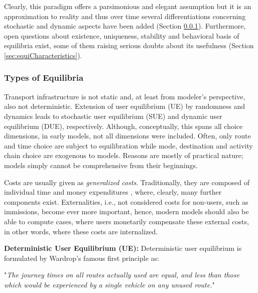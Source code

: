 Clearly, this paradigm offers a parsimonious and elegant assumption but it is an approximation to reality and thus over time several differentiations concerning stochastic and dynamic aspects have been added (Section \ref{sec:types}). Furthermore, open questions about existence, uniqueness, stability and behavioral basis of equilibria exist, some of them raising serious doubts about its usefulness (Section \ref{sec:equiCharacteristics}).

\subsubsection{Types of Equilibria}
\label{sec:types}
Transport infrastructure is not static and, at least from modeler's perspective, also not deterministic. Extension of user equilibrium (UE) by randomness and dynamics leads to stochastic user equilibrium (SUE) and dynamic user equilibrium (DUE), respectively. Although, conceptually, this spans all choice dimensions, in early models, not all dimensions were included. Often, only route and time choice are subject to equilibration while mode, destination and activity chain choice are exogenous to models. Reasons are mostly of practical nature; models simply cannot be comprehensive from their beginnings.

Costs are usually given as \emph{generalized costs}. Traditionally, they are composed of individual time and money expenditures \citep[][p.12]{Bates_HensherButton_2000}, where, clearly, many further components exist. Externalities, i.e., not considered costs for non-users, such as immissions, become ever more important, hence, modern models should also be able to compute cases, where users monetarily compensate these external costs, in other words, where these costs are internalized.

\textbf{Deterministic User Equilibrium (UE):}
Deterministic user equilibrium is formulated by Wardrop's famous first principle \citet[][]{Wardrop_PICE_1952} as: \begin{spacing}{1.0} "\emph{The journey times on all routes actually used are equal, and less than those which would be experienced by a single vehicle on any unused route.}" \end{spacing}

